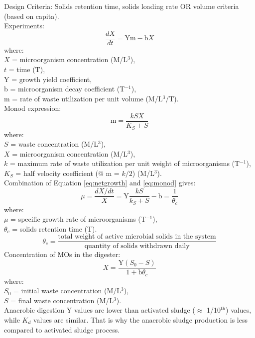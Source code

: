 \documentclass{article}
\numberwithin{equation}{section}
\begin{document}
\begin{enumerate}
    Design Criteria: Solids retention time, solids loading rate OR volume criteria (based on capita).\\
    Experiments:
    \begin{equation}
        \frac{dX}{dt} = \text{Ym} - \text{b}X
        \label{eq:netgrowth}
    \end{equation}
    where:\\
    $X$ = microorganism concentration (M/L$^3$),\\
    $t$ = time (T),\\
    Y = growth yield coefficient,\\
    b = microorganism decay coefficient (T$^{-1}$),\\
    m = rate of waste utilization per unit volume (M/L$^3$/T).\\
    Monod expression:
    \begin{equation}
        \text{m} = \frac{kSX}{K_S+S}
        \label{eq:monod}
    \end{equation}
    where:\\
    $S$ = waste concentration (M/L$^3$),\\
    $X$ = microorganism concentration (M/L$^3$),\\
    $k$ = maximum rate of waste utilization per unit weight of microorganisms (T$^{-1}$),\\
    $K_S$ = half velocity coefficient (@ m = $k/2$) (M/L$^3$).\\
    Combination of Equation \ref{eq:netgrowth} and \ref{eq:monod} gives:
    \[
    \mu = \frac{dX/dt}{X} = \text{Y}\frac{kS}{k_S+S} - \text{b} = \frac{1}{\theta_c}
    \]
    where:\\
    $\mu$ = specific growth rate of microorganisms (T$^{-1}$),\\
    $\theta_c$ = solids retention time (T).
    \[
    \theta_c = \frac{\text{total weight of active microbial solids in the system}}{\text{quantity of solids withdrawn daily}}
    \]
    Concentration of MOs in the digester:
    \[
    X = \frac{\text{Y}(S_0-S)}{1+\text{b}\theta_c}
    \]
    where:\\
    $S_0$ = initial waste concentration (M/L$^3$),\\
    $S$ = final waste concentration (M/L$^3$).\\
    Anaerobic digestion Y values are lower than activated sludge ($\approx$ 1/10$^\text{th}$) values, while $K_d$ values are similar. That is why the anaerobic sludge production is less compared to activated sludge process.
\end{enumerate}
\end{document}
